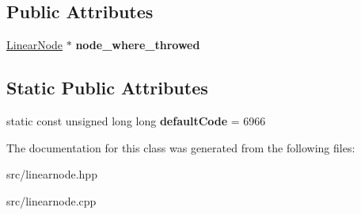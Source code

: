 \subsection*{Public Attributes}
\begin{DoxyCompactItemize}
\item 
\mbox{\label{classDataJuggler_1_1DamagedLinearEx_a64250cbbe28d6c47d0feb39c4007b9e9}} 
\hyperlink{classDataJuggler_1_1LinearNode}{Linear\+Node} $\ast$ {\bfseries node\+\_\+where\+\_\+throwed}
\end{DoxyCompactItemize}
\subsection*{Static Public Attributes}
\begin{DoxyCompactItemize}
\item 
\mbox{\label{classDataJuggler_1_1DamagedLinearEx_a4b4791d5cf0f7626f4e98be770b23a46}} 
static const unsigned long long {\bfseries default\+Code} = 6966
\end{DoxyCompactItemize}


The documentation for this class was generated from the following files\+:\begin{DoxyCompactItemize}
\item 
src/linearnode.\+hpp\item 
src/linearnode.\+cpp\end{DoxyCompactItemize}
